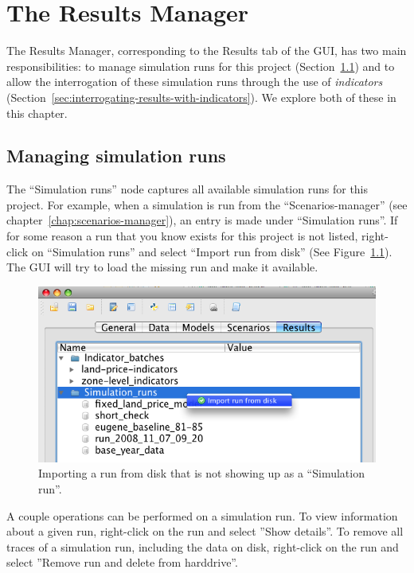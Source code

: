 
\chapter{The Results Manager}

The Results Manager, corresponding to the Results tab
of the GUI, has two main responsibilities: to manage simulation runs for this project
(Section~\ref{sec:managing-simulation-runs}) and to allow the
interrogation of these simulation runs through the use of
\emph{indicators}
(Section~\ref{sec:interrogating-results-with-indicators}). We explore
both of these in this chapter.

\section{Managing simulation runs}
\label{sec:managing-simulation-runs}

The ``Simulation runs'' node captures all
available simulation runs for this project. For example, when a
simulation is run from the ``Scenarios-manager'' (see
chapter~\ref{chap:scenarios-manager}), an entry is made under
``Simulation runs''. If for some reason a run that you know exists
for this project is not listed, right-click on 
``Simulation runs'' and select ``Import run from disk'' (See
Figure~\ref{fig:results-manager-import-run}). The GUI will try to load
the missing run and make it available.

\begin{figure}[htp]
\begin{center}
\includegraphics[width=.8\textwidth]{part-gui/images/result-manager-import-run-from-disk.png}
\end{center}
\caption{Importing a run from disk that is not showing up as a
``Simulation run''.}
\label{fig:results-manager-import-run}
\end{figure}

A couple operations can be performed on a simulation run. To view
information about a given run, right-click on the run and select
''Show details''. To remove all traces of a simulation run,
including the data on disk, right-click on the run and select
''Remove run and delete from harddrive''.

